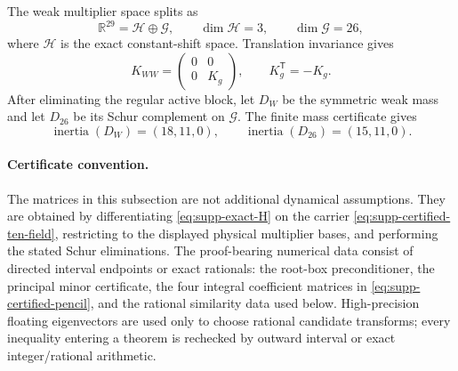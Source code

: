 \documentclass[11pt]{article}
\numberwithin{equation}{section}
\theoremstyle{definition}
\theoremstyle{remark}
\begin{document}
The weak multiplier space splits as
\begin{equation}
 \mathbb R^{29}=\mathcal H\oplus\mathcal G,
 \qquad \dim\mathcal H=3,
 \qquad \dim\mathcal G=26,
 \label{eq:supp-certified-weak-split}
\end{equation}
where $\mathcal H$ is the exact constant-shift space.  Translation invariance
gives
\begin{equation}
 K_{WW}=\begin{pmatrix}0&0\\0&K_g\end{pmatrix},
 \qquad K_g^{\mathsf T}=-K_g.
 \label{eq:supp-certified-Kblock}
\end{equation}
After eliminating the regular active block, let $D_W$ be the symmetric weak
mass and let $D_{26}$ be its Schur complement on $\mathcal G$.  The finite
mass certificate gives
\begin{equation}
 \operatorname{inertia}(D_W)=(18,11,0),
 \qquad
 \operatorname{inertia}(D_{26})=(15,11,0).
 \label{eq:supp-certified-mass-inertia}
\end{equation}

\paragraph{Certificate convention.}
The matrices in this subsection are not additional dynamical assumptions.
They are obtained by differentiating \eqref{eq:supp-exact-H} on the carrier
\eqref{eq:supp-certified-ten-field}, restricting to the displayed physical
multiplier bases, and performing the stated Schur eliminations.  The
proof-bearing numerical data consist of directed interval endpoints or exact
rationals: the root-box preconditioner, the principal minor certificate, the
four integral coefficient matrices in \eqref{eq:supp-certified-pencil}, and
the rational similarity data used below.  High-precision floating
eigenvectors are used only to choose rational candidate transforms; every
inequality entering a theorem is rechecked by outward interval or exact
integer/rational arithmetic.
\end{document}
